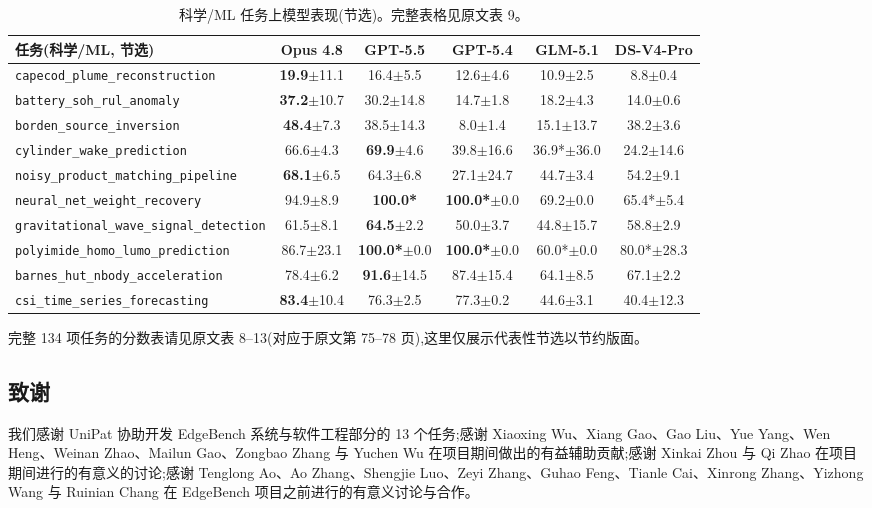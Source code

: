 \begin{table}[h]
\centering
\footnotesize
\setlength{\tabcolsep}{2pt}
\begin{tabular}{l ccccc}
\toprule
\textbf{任务(科学/ML, 节选)} & \textbf{Opus 4.8} & \textbf{GPT-5.5} & \textbf{GPT-5.4} & \textbf{GLM-5.1} & \textbf{DS-V4-Pro} \\
\midrule
\texttt{capecod\_plume\_reconstruction} & \textbf{19.9}$\pm$11.1 & 16.4$\pm$5.5 & 12.6$\pm$4.6 & 10.9$\pm$2.5 & 8.8$\pm$0.4 \\
\texttt{battery\_soh\_rul\_anomaly} & \textbf{37.2}$\pm$10.7 & 30.2$\pm$14.8 & 14.7$\pm$1.8 & 18.2$\pm$4.3 & 14.0$\pm$0.6 \\
\texttt{borden\_source\_inversion} & \textbf{48.4}$\pm$7.3 & 38.5$\pm$14.3 & 8.0$\pm$1.4 & 15.1$\pm$13.7 & 38.2$\pm$3.6 \\
\texttt{cylinder\_wake\_prediction} & 66.6$\pm$4.3 & \textbf{69.9}$\pm$4.6 & 39.8$\pm$16.6 & 36.9*$\pm$36.0 & 24.2$\pm$14.6 \\
\texttt{noisy\_product\_matching\_pipeline} & \textbf{68.1}$\pm$6.5 & 64.3$\pm$6.8 & 27.1$\pm$24.7 & 44.7$\pm$3.4 & 54.2$\pm$9.1 \\
\texttt{neural\_net\_weight\_recovery} & 94.9$\pm$8.9 & \textbf{100.0*} & \textbf{100.0*}$\pm$0.0 & 69.2$\pm$0.0 & 65.4*$\pm$5.4 \\
\texttt{gravitational\_wave\_signal\_detection} & 61.5$\pm$8.1 & \textbf{64.5}$\pm$2.2 & 50.0$\pm$3.7 & 44.8$\pm$15.7 & 58.8$\pm$2.9 \\
\texttt{polyimide\_homo\_lumo\_prediction} & 86.7$\pm$23.1 & \textbf{100.0*}$\pm$0.0 & \textbf{100.0*}$\pm$0.0 & 60.0*$\pm$0.0 & 80.0*$\pm$28.3 \\
\texttt{barnes\_hut\_nbody\_acceleration} & 78.4$\pm$6.2 & \textbf{91.6}$\pm$14.5 & 87.4$\pm$15.4 & 64.1$\pm$8.5 & 67.1$\pm$2.2 \\
\texttt{csi\_time\_series\_forecasting} & \textbf{83.4}$\pm$10.4 & 76.3$\pm$2.5 & 77.3$\pm$0.2 & 44.6$\pm$3.1 & 40.4$\pm$12.3 \\
\bottomrule
\end{tabular}
\caption{科学/ML 任务上模型表现(节选)。完整表格见原文表 9。}
\label{tab:scores-ml}
\end{table}

完整 134 项任务的分数表请见原文表 8--13(对应于原文第 75--78 页),这里仅展示代表性节选以节约版面。

\subsection{致谢}
\label{app:ack}

我们感谢 UniPat 协助开发 EdgeBench 系统与软件工程部分的 13 个任务;感谢 Xiaoxing Wu、Xiang Gao、Gao Liu、Yue Yang、Wen Heng、Weinan Zhao、Mailun Gao、Zongbao Zhang 与 Yuchen Wu 在项目期间做出的有益辅助贡献;感谢 Xinkai Zhou 与 Qi Zhao 在项目期间进行的有意义的讨论;感谢 Tenglong Ao、Ao Zhang、Shengjie Luo、Zeyi Zhang、Guhao Feng、Tianle Cai、Xinrong Zhang、Yizhong Wang 与 Ruinian Chang 在 EdgeBench 项目之前进行的有意义讨论与合作。

